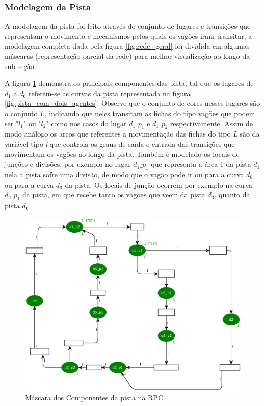 \subsubsection{Modelagem da Pista}
\label{sub:model_pista}
A modelagem da pista foi feito através do conjunto de lugares e transições que representam o movimento e mecanismos pelos quais os vagões iram transitar, a modelagem completa dada pela figura \ref{fig:rede_geral} foi dividida em algumas máscaras (representação parcial da rede) para melhor visualização ao longo da sub seção. 

A figura \ref{fig:pista_RPC} demonstra os principais componentes das pista, tal que os lugares de $d_1$ a $d_6$ referem-se as curvas da pista representada na figura \ref{fig:pista_com_dois_agentes}. Observe que o conjunto de cores nesses lugares são o conjunto $L$, indicando que neles transitam as fichas do tipo vagões que podem ser "$l_1$" ou "$l_2$" como nos casos do lugar $d_1\_p_1$ e $d_1\_p_2$ respectivamente. Assim de modo análogo os arcos que referentes a movimentação das fichas do tipo \textit{L} são da variável tipo \textit{l} que controla os graus de saída e entrada das transições que movimentam os vagões ao longo da pista. Também é modelado os locais de junções e divisões, por exemplo no lugar $d_1\_p_1$ que representa a área $1$ da pista $d_1$ nela a pista sofre uma divisão, de modo que o vagão pode ir ou para a curva $d_6$ ou para a curva $d_3$ da pista. Os locais de junção ocorrem por exemplo na curva $d_2\_p_1$ da pista, em que recebe tanto os vagões que veem da pista $d_3$, quanto da pista $d_6$.
\begin{figure}[ht]
    \centering
    \caption{Máscara dos Componentes da pista na RPC}
    \label{fig:pista_RPC}
    \includegraphics[width=1\linewidth]{figures//Simulation//Modelagem/pista.eps}
\end{figure}

